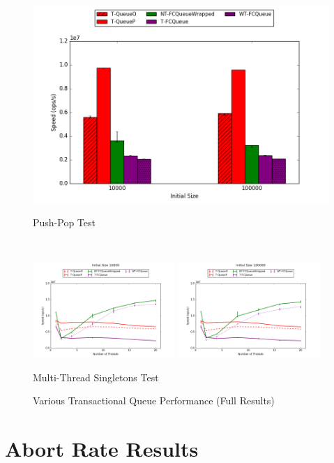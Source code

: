 \begin{figure}[H]
    \centering
	\begin{minipage}{0.5\textwidth}
    \centering
    \includegraphics[width=\textwidth]{fcqueues/allQ:PushPop.png}
    \caption*{Push-Pop Test}
	\end{minipage}\\
    \begin{minipage}{\textwidth}
    \centering
    \includegraphics[width=0.48\textwidth]{fcqueues/allQ:RandSingleOps10000.png}
    \includegraphics[width=0.48\textwidth]{fcqueues/allQ:RandSingleOps100000.png}
    \caption*{Multi-Thread Singletons Test}
	\end{minipage}
    \caption{Various Transactional Queue Performance (Full Results)}
\end{figure}

\section{Abort Rate Results}
\label{app:queue_mt}


